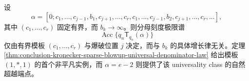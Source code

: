 \begin{conjecture}[爆破模板的输运相图刚性]\label{conj:conclusion-kronecker-sparse-blowup-transport-phase-rigidity}
设
\[
\alpha=[0;c_1,\ldots,c_{j-1},b_1,c_{j+1},\ldots,c_r,
c_1,\ldots,c_{j-1},b_2,c_{j+1},\ldots,c_r,\ldots],
\]
其中 \((c_1,\ldots,c_r)\) 固定有界，而 \(b_k\to\infty\)。则分母刻度极限谱
\[
\operatorname{Acc}\bigl\{q_n\mathsf T_{q_n}(\alpha)\bigr\}
\]
仅由有界模板 \((c_1,\ldots,c_r)\) 与爆破位置 \(j\) 决定，而与 \(b_k\) 的具体增长律无关。定理 \ref{thm:conclusion-kronecker-sparse-blowup-universal-denominator-law} 给出模板 \((1,\ast,1)\) 的首个非平凡实例，而 \(\alpha=e-2\) 则提供了该 universality class 的自然超越端点。
\end{conjecture}
